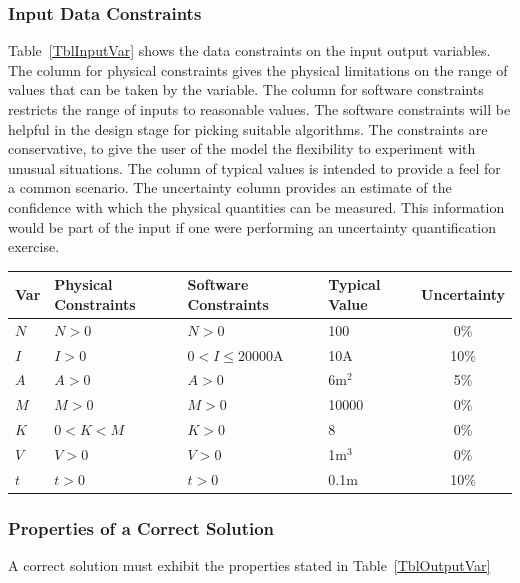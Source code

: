 \documentclass[12pt]{article}
\begin{document}
\subsubsection{Input Data Constraints} \label{sec_DataConstraints}    
Table~\ref{TblInputVar} shows the data constraints on the input output
variables.  The column for physical constraints gives the physical limitations
on the range of values that can be taken by the variable.  The column for
software constraints restricts the range of inputs to reasonable values.  The
software constraints will be helpful in the design stage for picking suitable
algorithms.  The constraints are conservative, to give the user of the model the
flexibility to experiment with unusual situations.  The column of typical values
is intended to provide a feel for a common scenario.  The uncertainty column
provides an estimate of the confidence with which the physical quantities can be
measured.  This information would be part of the input if one were performing an
uncertainty quantification exercise.

\begin{table}[!h]
  \caption{Input Variables} \label{TblInputVar}
  \renewcommand{\arraystretch}{1.2}
\noindent \begin{longtable*}{l l l l c} 
  \toprule
  \textbf{Var} & \textbf{Physical Constraints} & \textbf{Software Constraints} &
                             \textbf{Typical Value} & \textbf{Uncertainty}\\
  \midrule 
  $N$ & $N > 0$ & $N > 0$ & 100 & 0\%
  \\
  $I$ & $I > 0$ & $0 < I \leq 20000 \text{A}$ & 10A & 10\%
  \\
  $A$ & $A > 0$ & $A > 0$ & 6m$^2$ & 5\%
  \\
  $M$ & $M > 0$ & $M > 0$ & 10000 & 0\%
  \\
  $K$ & $0 < K < M$ & $K > 0$ & 8 & 0\%
  \\
  $V$ & $V > 0$ & $V > 0$ & 1m$^3$ & 0\%
  \\
  $t$ & $t > 0$ & $t > 0$ & 0.1m & 10\%
  \\
  \bottomrule
\end{longtable*}
\end{table}

\subsubsection{Properties of a Correct Solution} \label{sec_CorrectSolution}

\noindent
A correct solution must exhibit the properties stated in Table~\ref{TblOutputVar}
\end{document}
